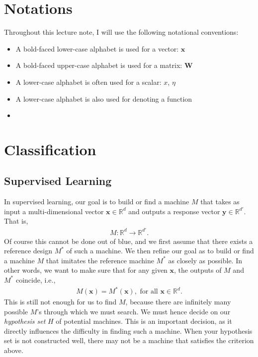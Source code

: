 \documentclass{report}
\newcommand{\vect}[1]{\mathbf{#1}}
\newcommand{\matr}[1]{\mathbf{#1}}
\newcommand{\vx}[0]{\vect{x}}
\newcommand{\vy}[0]{\vect{y}}
\newcommand{\mW}[0]{\matr{W}}
\begin{document}
\chapter*{Notations}

Throughout this lecture note, I will use the following notational conventions:
\begin{itemize}
    \item A bold-faced lower-case alphabet is used for a vector: $\vx$
    \item A bold-faced upper-case alphabet is used for a matrix: $\mW$
    \item A lower-case alphabet is often used for a scalar: $x$, $\eta$
    \item A lower-case alphabet is also used for denoting a function
    \item 
\end{itemize}


\chapter{Classification}
\label{sec:classification}

\section{Supervised Learning}
\label{sec:supervised_learning}

In supervised learning, our goal is to build or find a machine $M$ that takes as
input a multi-dimensional vector $\vx \in \mathbb{R}^d$ and outputs a response
vector $\vy \in \mathbb{R}^{d'}$.  That is,
\begin{align*}
    M: \mathbb{R}^d \to \mathbb{R}^{d'}.
\end{align*}
Of course this cannot be done out of blue, and we first assume that there exists
a reference design $M^*$ of such a machine.  We then refine our goal as to build
or find a machine $M$ that imitates the reference machine $M^*$ as closely as
possible. In other words, we want to make sure that for any given $\vx$, the
outputs of $M$ and $M^*$ coincide, i.e.,
\begin{align}
    \label{eq:classification0}
    M(\vx) = M^*(\vx),\text{ for all } \vx \in \mathbb{R}^d.
\end{align}
This is still not enough for us to find $M$, because there are infinitely many
possible $M$'s through which we must search. We must hence decide on our {\it
hypothesis set} $H$ of potential machines. This is an important decision, as it
directly influences the difficulty in finding such a machine. When your
hypothesis set is not constructed well, there may not be a machine that
satisfies the criterion above. 
\end{document}
